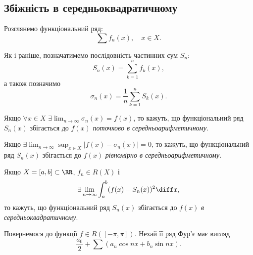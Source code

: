 \subsection{Збіжність в середньоквадратичному}

Розглянемо функціональний ряд:
\begin{equation}
    \sum f_n(x), \quad x \in X.
\end{equation}

Як і раніше, позначатимемо послідовність частинних сум $S_n$:
\begin{equation}
    S_n(x) = \sum_{k = 1}^n f_k(x),
\end{equation}
а також позначимо
\begin{equation}
    \sigma_n(x) = \frac{1}{n} \sum_{k = 1}^n S_k(x).
\end{equation}

\begin{definition}
    Якщо $\forall x \in X$ $\exists \lim_{n \to \infty} \sigma_n(x) = f(x)$, то кажуть, що функціональний ряд $S_n(x)$ збігається до $f(x)$ \textit{поточково в середньоарифметичному}.
\end{definition}

\begin{definition}
    Якщо $\exists \lim_{n \to \infty} \sup_{x \in X} |f(x) - \sigma_n(x)| = 0$, то кажуть, що функціональний ряд $S_n(x)$ збігається до $f(x)$ \textit{рівномірно в середньоарифметичному}.
\end{definition}

\begin{definition}
    Якщо $X = [a, b] \subset \RR$, $f_n \in R(X)$ і 
    \begin{equation}
        \exists \lim_{n \to \infty} \int_a^b (f(x) - S_n(x))^2 \diff x,
    \end{equation}
    то кажуть, що функціональний ряд $S_n(x)$ збігається до $f(x)$ \textit{в середньоквадратичному}.
\end{definition}

Повернемося до функції $f \in R([-\pi, \pi])$. Нехай її ряд Фур'є має вигляд
\begin{equation}
    \frac{a_0}{2} + \sum (a_n \cos n x + b_n \sin n x).
\end{equation}


